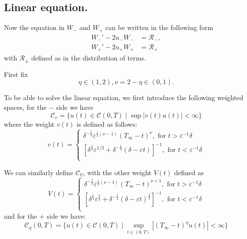 \documentclass[letterpaper,11pt]{article}
\newcommand{\eps}{\varepsilon}
\numberwithin{equation}{section}
\theoremstyle{plain}
\begin{document}
\pagebreak
\subsection{Linear equation.} 

Now the equation in $W_-$ and $W_+$ can be written in the following form
\begin{align*}
W_-' - 2u_- W_- &= \mathcal{R}_- ,\\
W_+' - 2u_+ W_+ &= \mathcal{R}_+
\end{align*}
with $\mathcal{R}_{\pm}$ defined as in the distribution of terms.

First fix
\[
\eta \in (1,2), \nu = 2-\eta\in (0,1).
\]

To be able to solve the linear equation, we first introduce the following weighted spaces, for the $-$ side we have
\[
\mathcal{C}_v = \{u(t) \in \mathcal{C}(0,T) \mid \sup |v(t) u(t)| < \infty\}
\]
where the weight $v(t)$ is defined as follows:
\[
v(t)=
\begin{cases}
\delta^{-\frac{1}{4}}\eps^{\frac{1}{3}(\nu-1)} (T_\infty-t)^\nu, \text{ for }t> \eps^{-1}\delta\\
[\delta^{\frac{1}{4}}\eps^{1/3}+\delta^{-\frac{1}{4}}(\delta-\eps t)]^{-1}, \text{ for }t < \eps^{-1}\delta\\
\end{cases}
\]

We can similarly define $\mathcal{C}_V$, with the other weight $V(t)$ defined as
\[
V(t)=
\begin{cases}
\delta^{-\frac{1}{4}}\eps^{\frac{1}{3}(\nu-1)} (T_\infty-t)^{\nu+1}, \text{ for }t> \eps^{-1}\delta\\
[\delta^{\frac{1}{4}}\eps^{\frac{2}{3}}+\delta^{-\frac{1}{4}}(\delta - \eps t)^{\frac{3}{2}}]^{-1}, \text{ for }t < \eps^{-1}\delta\\
\end{cases}
\]
and for the $+$ side we have:
\[
\mathcal{C}_\eta(0,T) = \{ u(t) \in \mathcal{C}(0,T) \mid \sup_{t\in (0,T)}|(T_\infty - t)^{\eta} u(t)| < \infty  \}
\]
\end{document}
